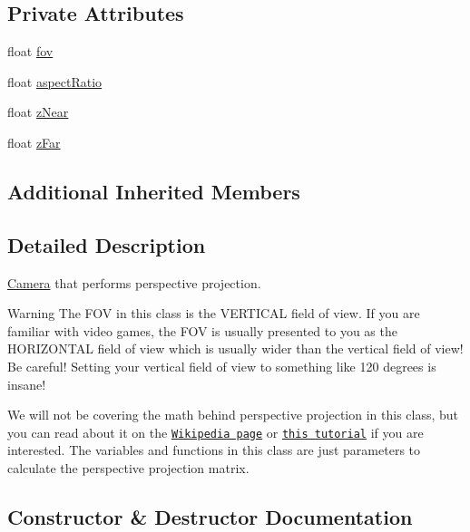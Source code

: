 \subsection*{Private Attributes}
\begin{DoxyCompactItemize}
\item 
float \hyperlink{class_perspective_camera_ad693187f75ab5bfc597066364483325c}{fov}
\item 
float \hyperlink{class_perspective_camera_ad96660d3109e54fa282955bf66a255eb}{aspect\+Ratio}
\item 
float \hyperlink{class_perspective_camera_a11c1dcd1bdeb4bf8294d6272fb4d2695}{z\+Near}
\item 
float \hyperlink{class_perspective_camera_af88e6161cd3c818d49e6421f52474a2b}{z\+Far}
\end{DoxyCompactItemize}
\subsection*{Additional Inherited Members}


\subsection{Detailed Description}
\hyperlink{class_camera}{Camera} that performs perspective projection. 

\begin{DoxyWarning}{Warning}
The F\+OV in this class is the V\+E\+R\+T\+I\+C\+AL field of view. If you are familiar with video games, the F\+OV is usually presented to you as the H\+O\+R\+I\+Z\+O\+N\+T\+AL field of view which is usually wider than the vertical field of view! Be careful! Setting your vertical field of view to something like 120 degrees is insane!
\end{DoxyWarning}
We will not be covering the math behind perspective projection in this class, but you can read about it on the \href{https://en.wikipedia.org/wiki/3D_projection#Perspective_projection}{\tt Wikipedia page} or \href{http://ogldev.atspace.co.uk/www/tutorial12/tutorial12.html}{\tt this tutorial} if you are interested. The variables and functions in this class are just parameters to calculate the perspective projection matrix. 

\subsection{Constructor \& Destructor Documentation}
\hypertarget{class_perspective_camera_adb5624bfee18c9390df3ba0612431124}{}\label{class_perspective_camera_adb5624bfee18c9390df3ba0612431124} 
